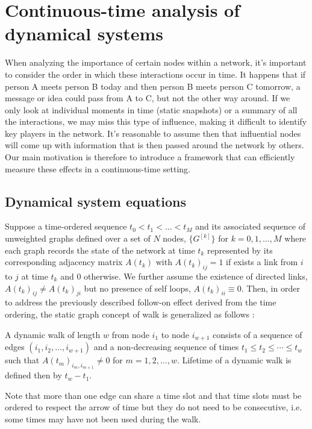 \chapter{Continuous-time analysis of dynamical systems}
\label{chap:cont}
When analyzing the importance of certain nodes within a network, it's important to consider the order in which these interactions occur in time. It happens that if person A meets person B today and then person B meets person C tomorrow, a message or idea could pass from A to C, but not the other way around. If we only look at individual moments in time (static snapshots) or a summary of all the interactions, we may miss this type of influence, making it difficult to identify key players in the network. It's reasonable to assume then that influential nodes will come up with information that is then passed around the network by others. Our main motivation is therefore to introduce a framework that can efficiently measure these effects in a continuous-time setting.

\section{Dynamical system equations}
\label{sec:ode}
Suppose a time-ordered sequence $t_0 < t_1 < \dots < t_M $ and its associated sequence of unweighted graphs defined over a set of $N$ nodes, $\{G^{[k]}\}$ for $k = 0,1,\dots,M$ where each graph records the state of the network at time $t_k$ represented by its corresponding adjacency matrix $A(t_k)$ with $A(t_k)_{ij} = 1$ if exists a link from $i$ to $j$ at time $t_k$ and $0$ otherwise. We further assume the existence of directed links, $A(t_k)_{ij} \ne A(t_k)_{ji}$ but no presence of self loops, $A(t_k)_{ii} \equiv 0$. Then, in order to address the previously described follow-on effect derived from the time ordering, the static graph concept of walk is generalized as follows \cite{grindrod2011communicability}:
\begin{definition}
    A dynamic walk of length $w$ from node $i_1$ to node $i_{w+1}$ consists of a sequence of edges $(i_1,i_2,\dots,i_{w+1})$ and a non-decreasing sequence of times $t_1\le t_2\le \cdots \le t_w$ such that $A(t_m)_{i_m,i_{m+1}}\ne 0$ for $m=1,2,\dots,w$. Lifetime of a dynamic walk is defined then by $t_w - t_1$. 
\end{definition}
Note that more than one edge can share a time slot and that time slots must be ordered to respect the arrow of time but they do not need to be consecutive, i.e. some times may have not been used during the walk.

